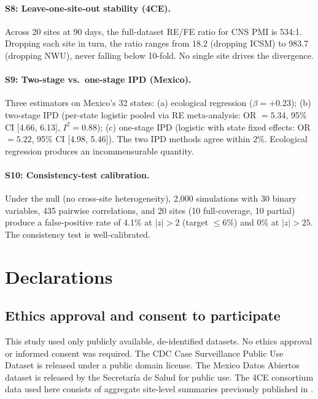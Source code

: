 \documentclass[11pt]{article}
\begin{document}
\paragraph{S8: Leave-one-site-out stability (4CE).}
Across 20 sites at 90 days, the full-dataset RE/FE ratio for CNS PMI
is 534:1.  Dropping each site in turn, the ratio ranges from 18.2
(dropping ICSM) to 983.7 (dropping NWU), never falling below 10-fold.
No single site drives the divergence.

\paragraph{S9: Two-stage vs.\ one-stage IPD (Mexico).}
Three estimators on Mexico's 32 states: (a) ecological regression
($\beta = +0.23$); (b) two-stage IPD (per-state logistic pooled
via RE meta-analysis: OR $= 5.34$, 95\% CI [4.66, 6.13],
$I^2 = 0.88$); (c) one-stage IPD (logistic with state fixed effects:
OR $= 5.22$, 95\% CI [4.98, 5.46]).  The two IPD methods agree
within 2\%.  Ecological regression produces an incommensurable quantity.

\paragraph{S10: Consistency-test calibration.}
Under the null (no cross-site heterogeneity), 2{,}000 simulations
with 30 binary variables, 435 pairwise correlations, and 20 sites
(10 full-coverage, 10 partial) produce a false-positive rate of
4.1\% at $|z| > 2$ (target $\leq 6\%$) and 0\% at $|z| > 25$.
The consistency test is well-calibrated.


\section*{Declarations}

\subsection*{Ethics approval and consent to participate}
This study used only publicly available, de-identified datasets.  No
ethics approval or informed consent was required.  The CDC Case
Surveillance Public Use Dataset is released under a public domain license.
The Mexico Datos Abiertos dataset is released by the Secretar\'{i}a de
Salud for public use.  The 4CE consortium data used here consists of
aggregate site-level summaries previously published in
\citet{four_ce_neuro2021}.
\end{document}
